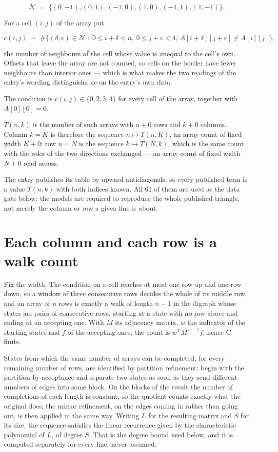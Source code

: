 \documentclass[11pt]{article}
\theoremstyle{definition}
\begin{document}
\[\mathcal{N} \;=\; \{(0,-1), (0,1), (-1,0), (1,0), (-1,1), (1,-1)\}.\]

For a cell $(i,j)$ of the array put

\[c(i,j) \;=\; \#\bigl\{(\delta,\varepsilon)\in\mathcal{N} \;:\; 0\le i+\delta<n,\ 0\le j+\varepsilon<4,\ A[i+\delta][j+\varepsilon] \neq A[i][j]\bigr\},\]

the number of neighbours of the cell whose value is unequal to the cell's own. Offsets that leave the array are not counted, so cells on the border have fewer neighbours than interior ones --- which is what makes the two readings of the entry's wording distinguishable on the entry's own data.

The condition is $c(i,j) \in \{0, 2, 3, 4\}$ for every cell of the array, together with $A[0][0]=0$.

$T(n,k)$ is the number of such arrays with $n + 0$ rows and $k + 0$ columns. Column $k = K$ is therefore the sequence $n \mapsto T(n,K)$, an array count of fixed width $K + 0$; row $n = N$ is the sequence $k \mapsto T(N,k)$, which is the same count with the roles of the two directions exchanged --- an array count of fixed width $N + 0$ read across.

The entry publishes its table by upward antidiagonals, so every published term is a value $T(n,k)$ with both indices known. All 61 of them are used as the data gate below: the models are required to reproduce the whole published triangle, not merely the column or row a given line is about.

\section{Each column and each row is a walk count}

Fix the width. The condition on a cell reaches at most one row up and one row down, so a window of three consecutive rows decides the whole of its middle row, and an array of $n$ rows is exactly a walk of length $n-1$ in the digraph whose states are pairs of consecutive rows, starting at a state with no row above and ending at an accepting one. With $M$ its adjacency matrix, $w$ the indicator of the starting states and $f$ of the accepting ones, the count is $w^{\mathsf T}M^{\,n-1}f$, hence C-finite.

States from which the same number of arrays can be completed, for every remaining number of rows, are identified by partition refinement: begin with the partition by acceptance and separate two states as soon as they send different numbers of edges into some block. On the blocks of the result the number of completions of each length is constant, so the quotient counts exactly what the original does; the mirror refinement, on the edges coming in rather than going out, is then applied in the same way. Writing $L$ for the resulting matrix and $S$ for its size, the sequence satisfies the linear recurrence given by the characteristic polynomial of $L$, of degree $S$. That is the degree bound used below, and it is computed separately for every line, never assumed.
\end{document}

